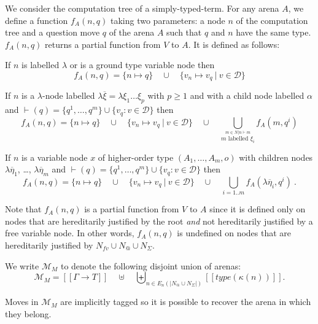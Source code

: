 \documentclass{llncs}
\newcommand{\lsem}{[\![} %
\newcommand{\rsem}{]\!]} %
\newcommand{\sem}[1]{{\lsem #1 \rsem}}
\newcommand\union{\cup}
\newcommand\Union{\bigcup}
\newcommand{\relimg}[1]{{(\!| #1 |\!)}}
\begin{document}
\begin{definition}
\label{def:phi_procedure}
We consider the computation tree of a simply-typed-term.
For any arena $A$, we define a function $f_A(n,q)$ taking two parameters:
a node $n$ of the computation tree and a question move $q$ of the arena $A$
such that $q$ and $n$ have the same type.
$f_A(n,q)$ returns a partial function from $V$ to $A$. It is defined as follows:

 If $n$ is labelled $\lambda$ or is a ground type variable node then
        $$f_A(n,q) = \{ n \mapsto q \} \quad \union \quad  \{ v_n \mapsto v_q \ | \ v \in \mathcal{D} \}$$

 If $n$ is a $\lambda$-node labelled $\lambda \overline{\xi} = \lambda \xi_1 \ldots \xi_p$ with $p\geq 1$ and with a child node
labelled $\alpha$ and $\vdash( q ) = \{ q^1, \ldots, q^m \} \union \{  v_q : v \in \mathcal{D} \} $ then
    $$
    f_A(n,q) =  \{ n \mapsto q \} \quad  \union \quad  \{ v_n \mapsto v_q \ | \ v \in \mathcal{D} \}
                      \quad \union \quad  \Union_{\stackrel{\displaystyle m \in N | n \vdash m}{\displaystyle m \mbox{ labelled } \xi_i}} f_A( m, q^i)
    $$

 If $n$ is a variable node $x$ of higher-order type $(A_1,\ldots,A_m,o)$ 
with children nodes $\lambda \overline{\eta}_1$, \ldots, $\lambda \overline{\eta}_m$ and 
$\vdash( q ) = \{ q^1, \ldots, q^m \} \union \{  v_q : v \in \mathcal{D} \} $ then
    $$f_A(n,q) =
         \{ n \mapsto q \} \quad \union\quad \{ v_n \mapsto v_q \ | \ v \in \mathcal{D}   \} \quad\union\quad     \Union_{i=1..m} f_A( \lambda \overline{\eta}_i, q^i) \ .
    $$

Note that $f_A(n,q)$ is a partial function from $V$ to $A$ since it is defined only
on nodes that are hereditarily justified by the root \emph{and} not hereditarily justified by a free variable node.
In other words, $f_A(n,q)$ is undefined on nodes that are hereditarily justified by $N_{fv} \union N_@ \union N_\Sigma$.
\end{definition}

We write $\mathcal{M}_M$ to denote the following disjoint union of arenas:
$$\mathcal{M}_M = \sem{\Gamma \rightarrow T} \quad \uplus \quad  \biguplus_{n \in E_n \relimg{N_@ \union N_\Sigma} } \sem{type(\kappa(n))}.$$

Moves in $\mathcal{M}_M$ are implicitly tagged so it is possible to recover the arena in which they belong.
\end{document}
